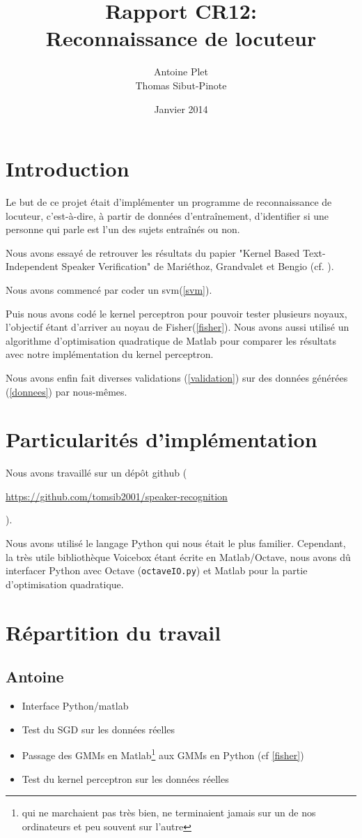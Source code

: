 \documentclass{article}
\title{Rapport CR12:\\
Reconnaissance de locuteur}
\author{Antoine Plet\\
Thomas Sibut-Pinote}
\date{Janvier 2014}
\let\urlorig\url
\renewcommand{\url}[1]{%
  \begin{otherlanguage}{english}\urlorig{#1}\end{otherlanguage}%
}
\begin{document}
\maketitle

\section{Introduction}
Le but de ce projet était d'implémenter un programme de reconnaissance de locuteur, c'est-à-dire, à partir de données d'entraînement, d'identifier si une personne qui parle est l'un des sujets entraînés ou non.

Nous avons essayé de retrouver les résultats du papier "Kernel Based Text-Independent Speaker Verification" de Mariéthoz, Grandvalet et Bengio (cf. \cite{Bengio}).

Nous avons commencé par coder un svm(\ref{svm}).

Puis nous avons codé le kernel perceptron pour pouvoir tester plusieurs noyaux, l'objectif étant d'arriver au noyau de Fisher(\ref{fisher}). Nous avons aussi utilisé un algorithme d'optimisation quadratique de Matlab pour comparer les résultats avec notre implémentation du kernel perceptron.

Nous avons enfin fait diverses validations (\ref{validation}) sur des données générées (\ref{donnees}) par nous-mêmes.

\section{Particularités d'implémentation}
\label{implémentation}
Nous avons travaillé sur un dépôt github (\url{https://github.com/tomsib2001/speaker-recognition}).

Nous avons utilisé le langage Python qui nous était le plus familier. Cependant, la très utile bibliothèque Voicebox étant écrite en Matlab/Octave, nous avons dû interfacer Python avec Octave (\texttt{octaveIO.py}) et Matlab pour la partie d'optimisation quadratique.


\section{Répartition du travail}
\label{répartition}
\subsection{Antoine}
\begin{itemize}
\item Interface Python/matlab
\item Test du SGD sur les données réelles
\item Passage des GMMs en Matlab\footnote{qui ne marchaient pas très bien, ne terminaient jamais sur un de nos ordinateurs et peu souvent sur l'autre} aux GMMs en Python (cf \ref{fisher})
\item Test du kernel perceptron sur les données réelles
\end{itemize}
\end{document}
